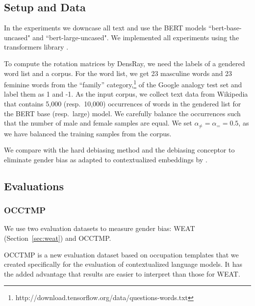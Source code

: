 \subsection{Setup and Data}
In the experiments we downcase all  text  and use the BERT models ``bert-base-uncased" and ``bert-large-uncased". We implemented all experiments using the transformers library .

To compute the rotation matrices by DensRay, we need the
labels of a gendered word list and a corpus. For the word
list, we get 23 masculine words and 23 feminine words from
the ``family''
category,\footnote{http://download.tensorflow.org/data/questions-words.txt}
of the Google analogy test set 
and label them as 1 and -1. As the input corpus, we collect
text data from Wikipedia that contains 5,000 (resp.\ 10,000)
occurrences of words in the gendered list for the BERT base
(resp.\ large) model. We carefully balance the occurrences such that the number of male and female samples are equal. We set  $\alpha_{\neq}=\alpha_{=}=0.5$, as we have balanced the training samples from the corpus.

We compare with the hard debiasing method \cite{mu2018all} and the debiasing conceptor \cite{karve2019conceptor} to eliminate gender bias as
adapted to contextualized embeddings by . 

\subsection{Evaluations}
\subsubsection{OCCTMP}
We use two evaluation datasets
to measure gender
bias: WEAT (Section~\ref{sec:weat}) and OCCTMP.

OCCTMP is a new evaluation dataset
based on occupation templates
that we created specifically
for
the evaluation of contextualized language models.  It has
the added advantage that results are easier to interpret
than those for WEAT.

